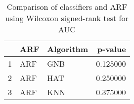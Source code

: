 \begin{table}
\footnotesize
\caption{Comparison of classifiers and ARF using Wilcoxon signed-rank test for AUC}
\label{tab:ARF wilcoxon AUC comparison}
\begin{tabular}{lllr}
\hline
 & ARF & Algorithm & p-value \\
\hline
1 & ARF & GNB & 0.125000 \\
2 & ARF & HAT & 0.250000 \\
3 & ARF & KNN & 0.375000 \\
\hline
\end{tabular}
\end{table}
